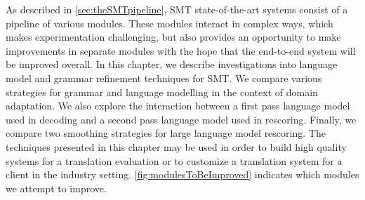 As described in \autoref{sec:theSMTpipeline}, SMT state-of-the-art
systems consist of a pipeline of various modules. These modules
interact in complex ways, which makes experimentation challenging, but
also provides an opportunity to make improvements in separate modules with
the hope that the end-to-end system will be improved overall.
In this chapter, we describe investigations into language model
and grammar refinement techniques for SMT. We compare various strategies for grammar
and language modelling in the context of domain adaptation. We also explore
the interaction between a first pass language model used in decoding and a second
pass language model used in rescoring. Finally, we compare two smoothing
strategies for large language model rescoring.
The techniques presented in this chapter may be used in order
to build high quality systems for a
translation evaluation or to customize a translation system
for a client in the industry setting.
\autoref{fig:modulesToBeImproved} indicates which modules we attempt
to improve.
%
